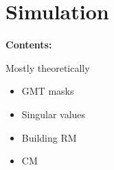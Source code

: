 
\chapter{Simulation} %

\noindent\textbf{\large Contents:}

\noindent\hrulefill
\noindent\startcontents[chapters]
\noindent{}
\noindent\hrulefill

\label{Chapter2} %

Mostly theoretically

\begin{itemize}
    \item GMT masks
    \item Singular values
    \item Building RM
    \item CM
\end{itemize}